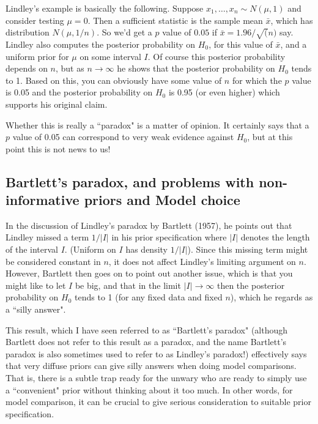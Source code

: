 \documentclass[12pt]{article}
\begin{document}
Lindley's example is basically the following. Suppose $x_1,\dots,x_n \sim N(\mu,1)$ and consider testing $\mu=0$. Then a sufficient statistic
is the sample mean $\bar{x}$, which has distribution $N(\mu,1/n)$. 
So we'd get a $p$ value of $0.05$ if $\bar{x} = 1.96/\sqrt(n)$ say.
Lindley also computes the posterior probability on $H_0$, for this value of $\bar{x}$, and a uniform prior for $\mu$ on some interval $I$. Of course this posterior probability depends on $n$, but as $n \rightarrow \infty$
he shows that the posterior probability on $H_0$ tends to 1.
Based on this, you can obviously have some value of $n$ for which the
$p$ value is 0.05 and the posterior probability on $H_0$ is 0.95 (or even higher) which supports his original claim.

Whether this is really a ``paradox" is a matter of opinion. It certainly says
that a $p$ value of 0.05 can correspond to very
weak evidence against $H_0$, but at this point this is not news to us!

\subsection{Bartlett's paradox, and problems with non-informative priors and Model choice}

In the discussion of Lindley's paradox by Bartlett (1957), he points out that Lindley missed a term $1/|I|$ in his prior specification where $|I|$ denotes
the length of the interval $I$. (Uniform on $I$ has density $1/|I|$).
Since this missing term might be considered constant in $n$, it does not affect Lindley's limiting argument on $n$. However, Bartlett then goes on
to point out another issue, which is that you might like to let $I$ be big,
 and that in the limit $|I| \rightarrow \infty$ then the posterior probability on $H_0$ tends to 1 (for any fixed data and fixed $n$), which he regards
 as a ``silly answer".

This result, which I have seen referred to as ``Bartlett's paradox" (although
Bartlett does not refer to this result as a paradox, and the name Bartlett's paradox is also sometimes used to refer to as Lindley's paradox!) effectively
says that very diffuse priors can give silly answers when doing model comparisons. That is, there is a subtle trap ready for the unwary who
are ready to simply use a ``convenient" prior without
thinking about it too much.
 In other words, for model comparison, it can
be crucial to give serious consideration to
suitable prior specification. 
 
\end{document}
